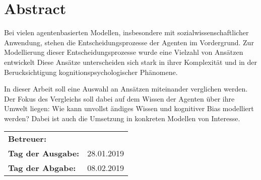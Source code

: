 \chapter*{Abstract}
Bei vielen agentenbasierten Modellen, insbesondere mit sozialwissenschaftlicher Anwendung, stehen die Entscheidungsprozesse der Agenten im Vordergrund. Zur
Modellierung dieser Entscheidungsprozesse wurde eine Vielzahl von Ansätzen entwickelt\cite{balke2014agents}
Diese Ansätze unterscheiden sich stark in ihrer Komplexität und in der Berucksichtigung
kognitionspsychologischer Phänomene.

In dieser Arbeit soll eine Auswahl an Ansätzen miteinander verglichen werden.
Der Fokus des Vergleichs soll dabei auf dem Wissen der Agenten über ihre Umwelt liegen: Wie kann unvollst ändiges Wissen und kognitiver Bias modelliert werden?
Dabei ist auch die Umsetzung in konkreten Modellen von Interesse.

\vfill

\begin{tabular}{ll}
	\bfseries Betreuer: & \parbox[t]{10cm}{\betreuer }\vspace{5mm} \\
	\bfseries Tag der Ausgabe: & 28.01.2019 \\
	\bfseries Tag der Abgabe: & 08.02.2019 \\
\end{tabular}

